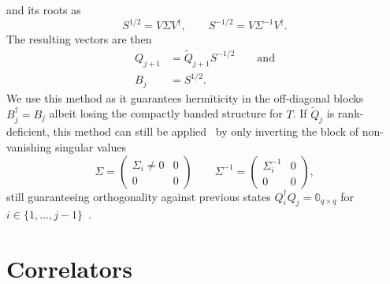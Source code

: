 and its roots as
\begin{equation}
    S^{1/2} = V \Sigma V^\dag,
    \qquad
    S^{-1/2} = V \Sigma^{-1} V^\dag.
\end{equation}
The resulting vectors are then
\begin{align}
    Q_{j+1} & = \tilde Q_{j+1} S^{-1/2} \qquad \text{and} \\
    B_j     & = S^{1/2}.
\end{align}
We use this method as it guarantees hermiticity in the off-diagonal blocks $B_j^\dag = B_j$
albeit losing the compactly banded structure for $T$.
If $\tilde Q_j$ is rank-deficient,
this method can still be applied~\cite{Brass2021} by only inverting the block of
non-vanishing singular values
\begin{equation}
    \Sigma =
    \begin{pmatrix}
        \Sigma_i \neq 0 & 0 \\
        0               & 0
    \end{pmatrix}
    \qquad
    \Sigma^{-1} =
    \begin{pmatrix}
        \Sigma_i^{-1} & 0 \\
        0             & 0
    \end{pmatrix},
\end{equation}
still guaranteeing orthogonality against previous states $Q_i^\dag Q_j = \mathbb{0}_{q\times q}$
for $i \in \{1,\ldots,j-1\}$~\cite{Golub2013}.

\section{Correlators}%
\label{sec:correlators}

